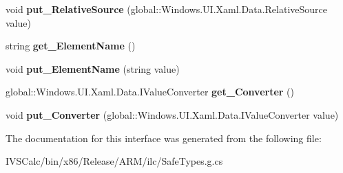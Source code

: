 \begin{DoxyCompactItemize}
void {\bfseries put\+\_\+\+Relative\+Source} (global\+::\+Windows.\+U\+I.\+Xaml.\+Data.\+Relative\+Source value)
\item 
\mbox{\label{interface_windows_1_1_u_i_1_1_xaml_1_1_data_1_1_i_binding_a0dd35d95c316a5990ee063205f2afa4f}} 
string {\bfseries get\+\_\+\+Element\+Name} ()
\item 
\mbox{\label{interface_windows_1_1_u_i_1_1_xaml_1_1_data_1_1_i_binding_a4a547237eb0c5a322ff147af7bffa296}} 
void {\bfseries put\+\_\+\+Element\+Name} (string value)
\item 
\mbox{\label{interface_windows_1_1_u_i_1_1_xaml_1_1_data_1_1_i_binding_aeb748478fa74d3af88e1a82f20a682c4}} 
global\+::\+Windows.\+U\+I.\+Xaml.\+Data.\+I\+Value\+Converter {\bfseries get\+\_\+\+Converter} ()
\item 
\mbox{\label{interface_windows_1_1_u_i_1_1_xaml_1_1_data_1_1_i_binding_a6f90eb586d1b47f03de725076ef98329}} 
void {\bfseries put\+\_\+\+Converter} (global\+::\+Windows.\+U\+I.\+Xaml.\+Data.\+I\+Value\+Converter value)
\end{DoxyCompactItemize}


The documentation for this interface was generated from the following file\+:\begin{DoxyCompactItemize}
\item 
I\+V\+S\+Calc/bin/x86/\+Release/\+A\+R\+M/ilc/Safe\+Types.\+g.\+cs\end{DoxyCompactItemize}
